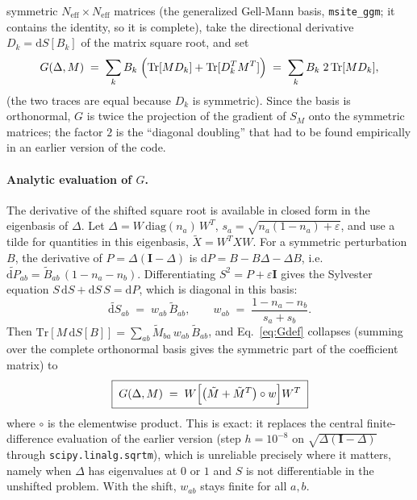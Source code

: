 \documentclass[11pt]{article}
\newcommand{\Neff}{N_{\mathrm{eff}}}
\begin{document}
symmetric $\Neff\times\Neff$ matrices (the generalized Gell-Mann basis,
\texttt{msite\_ggm}; it contains the identity, so it is complete), take the
directional derivative $D_k=\mathrm{d}S[B_k]$ of the matrix square root, and
set
\begin{equation}
  G(\Delta,M) \;=\; \sum_k B_k\;\Bigl(\mathrm{Tr}[M D_k]+\mathrm{Tr}[D_k^{T}M^{T}]\Bigr)
        \;=\; \sum_k B_k\;2\,\mathrm{Tr}[M D_k],
  \label{eq:Gdef}
\end{equation}
(the two traces are equal because $D_k$ is symmetric). Since the basis is
orthonormal, $G$ is twice the projection of the gradient of $S_M$ onto the
symmetric matrices; the factor $2$ is the ``diagonal doubling'' that had to
be found empirically in an earlier version of the code.

\paragraph{Analytic evaluation of $G$.} The derivative of the shifted square
root is available in closed form in the eigenbasis of $\Delta$. Let
$\Delta=W\,\mathrm{diag}(n_a)\,W^T$, $s_a=\sqrt{n_a(1-n_a)+\varepsilon}$,
and use a tilde for quantities in this eigenbasis, $\tilde X=W^TXW$. For a
symmetric perturbation $B$, the derivative of $P=\Delta(\mathbf I-\Delta)$ is
$\mathrm{d}P=B-B\Delta-\Delta B$, i.e.\ $\widetilde{\mathrm{d}P}_{ab}=
\tilde B_{ab}\,(1-n_a-n_b)$. Differentiating $S^2=P+\varepsilon\mathbf I$ gives
the Sylvester equation $S\,\mathrm{d}S+\mathrm{d}S\,S=\mathrm{d}P$, which is
diagonal in this basis:
\begin{equation}
  \widetilde{\mathrm{d}S}_{ab} \;=\; w_{ab}\,\tilde B_{ab},
  \qquad
  w_{ab} \;=\; \frac{1-n_a-n_b}{s_a+s_b}.
\end{equation}
Then $\mathrm{Tr}[M\,\mathrm{d}S[B]]=\sum_{ab}\tilde M_{ba}\,w_{ab}\,\tilde B_{ab}$, and
Eq.~\eqref{eq:Gdef} collapses (summing over the complete orthonormal basis
gives the symmetric part of the coefficient matrix) to
\begin{equation}
  \boxed{\; G(\Delta,M) \;=\; W\Bigl[\bigl(\tilde M+\tilde M^{T}\bigr)\circ w\Bigr]W^{T} \;}
  \label{eq:Gclosed}
\end{equation}
where $\circ$ is the elementwise product. This is exact: it replaces the
central finite-difference evaluation of the earlier version (step
$h=10^{-8}$ on $\sqrt{\Delta(\mathbf I-\Delta)}$ through
\texttt{scipy.linalg.sqrtm}), which is unreliable precisely where it matters,
namely when $\Delta$ has eigenvalues at $0$ or $1$ and $S$ is not
differentiable in the unshifted problem. With the shift, $w_{ab}$ stays
finite for all $a,b$.
\end{document}
